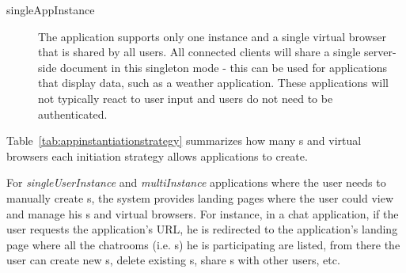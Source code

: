 \begin{description}
\item[singleAppInstance] The application supports only one instance and a single virtual browser
    that is shared by all users.
    All connected clients will share a single server-side document in this singleton mode - this can be
    used for applications that display data, such as a weather application. These applications will not
    typically react to user input and users do not need to be authenticated.

\end{description}

\instantiationStrategyTbl{}

Table~\ref{tab:appinstantiationstrategy} summarizes how many \appins{}s and virtual browsers
each initiation strategy allows applications to create.

For \emph{singleUserInstance} and \emph{multiInstance} applications where the user
needs to manually create \appins{}s, the system provides landing pages where the user 
could view and manage his \appins{}s and virtual browsers.
For instance, in a chat application, if the user requests the application's URL,
he is redirected to the application's landing page where all the
 chatrooms (i.e. \appins{}s) he is participating are listed,
from there the user can create new \appins{}s, delete existing \appins{}s, share
\appins{}s with other users, etc.




